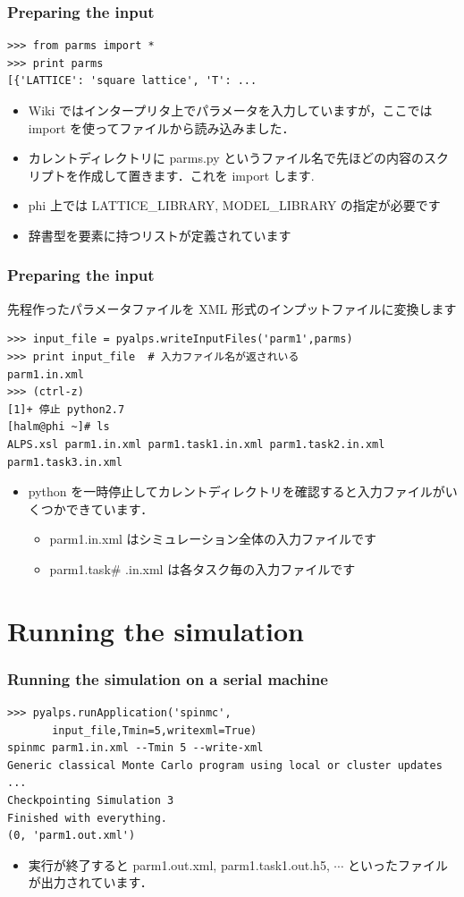 \begin{frame}[t,fragile]
\frametitle{Preparing the input}
\begin{lstlisting}
>>> from parms import *
>>> print parms
[{'LATTICE': 'square lattice', 'T': ...
\end{lstlisting}
\begin{itemize}
\item Wiki ではインタープリタ上でパラメータを入力していますが，ここでは import を使ってファイルから読み込みました．
\item カレントディレクトリに parms.py というファイル名で先ほどの内容のスクリプトを作成して置きます．これを import します.
\item phi 上では LATTICE\_LIBRARY, MODEL\_LIBRARY の指定が必要です
\item 辞書型を要素に持つリストが定義されています
\end{itemize}
\end{frame}

\begin{frame}[t,fragile]
\frametitle{Preparing the input}
先程作ったパラメータファイルを XML 形式のインプットファイルに変換します
\begin{lstlisting}
>>> input_file = pyalps.writeInputFiles('parm1',parms)
>>> print input_file  # 入力ファイル名が返されいる
parm1.in.xml
>>> (ctrl-z)
[1]+ 停止 python2.7
[halm@phi ~]# ls
ALPS.xsl parm1.in.xml parm1.task1.in.xml parm1.task2.in.xml parm1.task3.in.xml

\end{lstlisting}
\begin{itemize}
\item python を一時停止してカレントディレクトリを確認すると入力ファイルがいくつかできています．
  \begin{itemize}
  \item parm1.in.xml はシミュレーション全体の入力ファイルです
  \item parm1.task\# .in.xml は各タスク毎の入力ファイルです
  \end{itemize}
\end{itemize}

\end{frame}

\section{Running the simulation}
\begin{frame}[t,fragile]
\frametitle{Running the simulation on a serial machine}
\begin{lstlisting}
>>> pyalps.runApplication('spinmc',
       input_file,Tmin=5,writexml=True)
spinmc parm1.in.xml --Tmin 5 --write-xml
Generic classical Monte Carlo program using local or cluster updates
...
Checkpointing Simulation 3
Finished with everything.
(0, 'parm1.out.xml')
\end{lstlisting}
\begin{itemize}
\item 実行が終了すると parm1.out.xml, parm1.task1.out.h5, $\cdots$ といったファイルが出力されています．
\end{itemize}
 
\end{frame}

